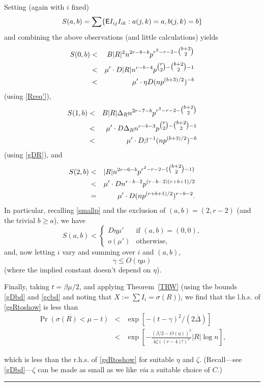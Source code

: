\documentclass[letterpaper,11pt]{article}
\newcommand{\beq}[1]{\begin{equation}\label{#1}}
\newcommand{\enq}[0]{\end{equation}}
\newcommand{\mn}[0]{\medskip\noindent}
\newcommand{\ov}[0]{\overline}
\newcommand{\0}[0]{\emptyset}
\renewcommand{\qed}[0]{\begin{flushright} \rule{2mm}{3mm} \end{flushright}}
\newcommand{\Cc}[0]{\tbinom}
\newcommand{\gb}[0]{\beta }
\newcommand{\gc}[0]{\gamma }
\newcommand{\gD}[0]{\Delta }
\newcommand{\gs}[0]{\sigma}
\newcommand{\gz}[0]{\zeta}
\begin{document}
Setting (again with $i$ fixed)
\[S(a,b) =\sum\{{\sf E} I_{ij}I_{ik}:a(j,k)=a,b(j,k)=b\}\]
and
combining the above observations
(and little calculations) yields
%
\begin{eqnarray*}
S(0,b)
&<&  B|R|^2n^{2r-8-b}p^{r^2-r-2-\Cc{b+2}{2}}\\
& < & \mu' \cdot D|R|n^{r-b-4}p^{\Cc{r}{2}-\Cc{b+2}{2}-1}
\\
& < & \mu' \cdot \eta D(np^{(b+3)/2})^{-b}
\end{eqnarray*}
(using \eqref{Rreq'}),
%
\begin{eqnarray*}
S(1,b)
&<&  B|R|\gD_R n^{2r-7-b}p^{r^2-r-2-\Cc{b+2}{2}}\\
& < & \mu' \cdot D\gD_R n^{r-b-3}p^{\Cc{r}{2}-\Cc{b+2}{2}-1}
\\
& < & \mu' \cdot  D \gb^{-1} (np^{(b+3)/2})^{-b}
\end{eqnarray*}
(using \eqref{gDR}), and
\begin{eqnarray*}
S(2,b)
&<&  |R| n^{2r-6-b}p^{r^2-r-2-\{\Cc{b+2}{2}-1\}}\\
& < & \mu' \cdot Dn^{r-b-2}p^{(r-b-2)(r+b+1)/2}
\\
& = & \mu' \cdot D(np^{(r+b+1)/2})^{r-b-2}.
\end{eqnarray*}
In particular, recalling \eqref{smallp} and the exclusion
of $(a,b)=(2,r-2)$ (and the trivial $b\geq a$),
we have
\[
S(a,b) <\left\{\begin{array}{ll}
D\eta\mu'&\mbox{if $(a,b)= (0,0)$,}\\
o(\mu')&\mbox{otherwise,}
\end{array}\right.
\]
and, now letting $i$ vary and summing over $i$ and $(a,b)$,
\beq{gcbd}
\gc \leq O(\eta \mu)
\enq
(where the implied constant doesn't depend on $\eta$).

\medskip
Finally, taking $t=\gb \mu/2$, and applying
Theorem~\ref{TRW} (using the bounds \eqref{gDbd} and
\eqref{gcbd} and
noting that $X:=\sum I_i= \gs(R)$),
we find that the l.h.s. of \eqref{gsRtoshow} is less than
\begin{eqnarray*}
\Pr(\gs(R)< \mu-t) &<&
\exp[-(t-\gc)^2/(2\ov{\gD})]\\
&<&
\exp[-\tfrac{(\gb/2 - O(\eta))^2}{4\gz((r-4)!)^2}|R|\log n],
\end{eqnarray*}


\mn
which is less than the r.h.s. of \eqref{gsRtoshow} for
suitable $\eta$ and $\gz$.
(Recall---see \eqref{gDbd}---$\gz$ can be made as small as
we like {\em via} a suitable choice of $C$.)\qed
\end{document}
